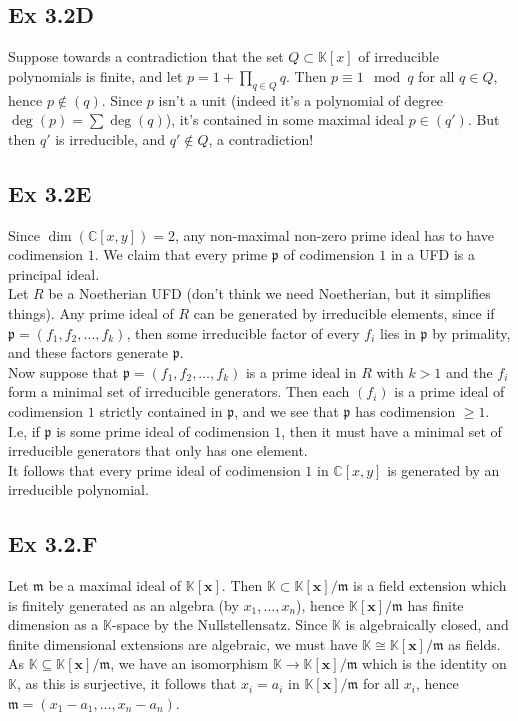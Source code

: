 \documentclass{article}
\theoremstyle{definition}
\newcommand{\C}{\mathbb{C}}
\newcommand{\K}{\mathbb{K}}
\newcommand{\Kx}{\K[\bm{x}]}
\begin{document}
\subsection*{Ex 3.2D}

Suppose towards a contradiction that the set $Q \subset \K[x]$ of irreducible
polynomials is finite, and let $p = 1 + \prod_{q \in Q} q$. Then $p \equiv 1
	\mod q$ for all $q \in Q$, hence $p \not \in (q)$. Since $p$ isn't a unit
(indeed it's a polynomial of degree $\deg(p) = \sum \deg(q)$), it's contained
in some maximal ideal $p \in (q')$. But then $q'$ is irreducible, and $q' \not
	\in Q$, a contradiction!


\subsection*{Ex 3.2E}

Since $\dim(\C[x, y]) = 2$, any non-maximal non-zero prime ideal has to have
codimension $1$. We claim that every prime $\mathfrak{p}$ of codimension $1$
in a UFD is a principal ideal. \\

Let $R$ be a Noetherian UFD (don't think we need Noetherian, but it simplifies
things). Any prime ideal of $R$ can be generated by irreducible elements, since
if $\mathfrak{p} = (f_1, f_2, \ldots, f_k)$, then some irreducible factor of
every $f_i$ lies in $\mathfrak{p}$ by primality, and these factors generate
$\mathfrak{p}$. \\

Now suppose that $\mathfrak{p} = (f_1, f_2, \ldots, f_k)$ is a prime ideal in
$R$ with $k > 1$ and the $f_i$ form a minimal set of irreducible generators.
Then each $(f_i)$ is a prime ideal of codimension $1$ strictly contained in
$\mathfrak{p}$, and we see that $\mathfrak{p}$ has codimension $\geq 1$. \\

I.e, if $\mathfrak{p}$ is some prime ideal of codimension $1$, then it must
have a minimal set of irreducible generators that only has one element. \\

It follows that every prime ideal of codimension $1$ in $\C[x, y]$ is generated
by an irreducible polynomial.

\subsection*{Ex 3.2.F}

Let $\mathfrak{m}$ be a maximal ideal of $\Kx$. Then $\K \subset
	\Kx/\mathfrak{m}$ is a field extension which is finitely generated as an
algebra (by $x_1, \ldots, x_n$), hence $\Kx/\mathfrak{m}$ has finite dimension
as a $\K$-space by the Nullstellensatz. Since $\K$ is algebraically closed, and
finite dimensional extensions are algebraic, we must have $\K \cong
	\Kx/\mathfrak{m}$ as fields. As $\K \subseteq \Kx/\mathfrak{m}$, we have an
isomorphism $\K \to \Kx/\mathfrak{m}$ which is the identity on $\K$, as this is
surjective, it follows that $x_i = a_i$ in $\Kx/\mathfrak{m}$ for all $x_i$,
hence $\mathfrak{m} = (x_1 - a_1, \ldots, x_n - a_n)$.
\end{document}
